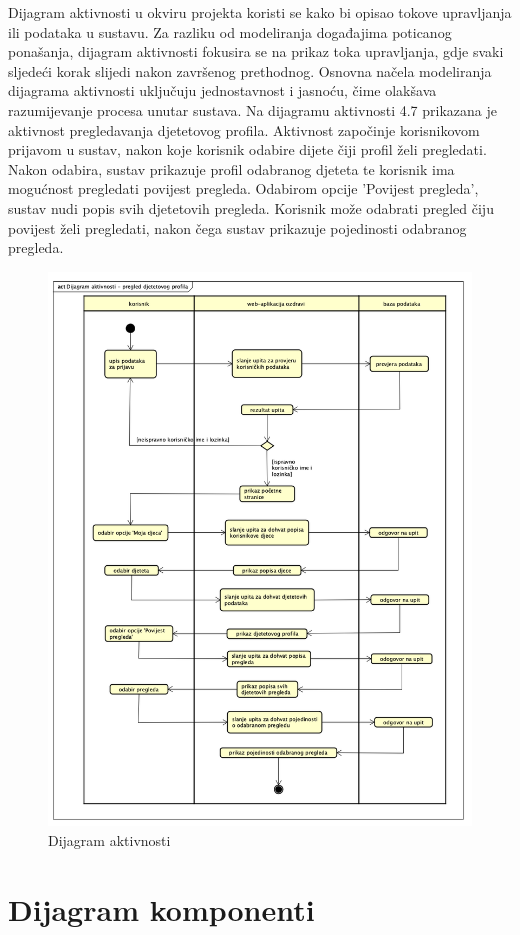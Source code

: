 		Dijagram aktivnosti u okviru projekta koristi se kako bi opisao tokove upravljanja ili podataka u sustavu. 
		Za razliku od modeliranja događajima poticanog ponašanja, dijagram aktivnosti fokusira se na prikaz toka upravljanja, 
		gdje svaki sljedeći korak slijedi nakon završenog prethodnog. Osnovna načela modeliranja dijagrama aktivnosti uključuju 
		jednostavnost i jasnoću, čime olakšava razumijevanje procesa unutar sustava.
		Na dijagramu aktivnosti 4.7 prikazana je 
		aktivnost pregledavanja djetetovog profila. Aktivnost započinje korisnikovom prijavom u sustav, nakon koje korisnik odabire 
		dijete čiji profil želi pregledati. Nakon odabira, sustav prikazuje profil odabranog djeteta te korisnik ima mogućnost pregledati 
		povijest pregleda. Odabirom opcije 'Povijest pregleda', sustav nudi popis svih djetetovih pregleda. Korisnik može odabrati 
		pregled čiju povijest želi pregledati, nakon čega sustav prikazuje pojedinosti odabranog pregleda. 
 
			\begin{figure}[H]
				\includegraphics[width=\textwidth]{slike/DijagramAktivnosti.png} 
				\caption{Dijagram aktivnosti} 
		    \end{figure}
			\eject
		\section{Dijagram komponenti}
		
		
